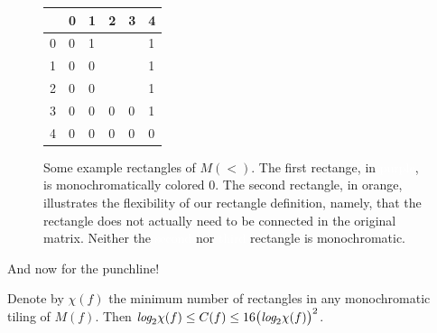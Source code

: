 \documentclass[12pt]{article}
\begin{document}
\begin{figure}[h]
\begin{minipage}{0.25\textwidth}
\begin{tabular}{|l|lllll|}
		\hline
		    & 0 & 1 & 2 & 3 & 4 \\\hline
		0   & 0 & 1 & \cellcolor{black!75}{\textcolor{white}{1}} & \cellcolor{black!75}{\textcolor{white}{1}} & 1 \\
		1   & 0 & 0 & \cellcolor{black!75}{\textcolor{white}{1}} & \cellcolor{black!75}{\textcolor{white}{1}} & 1 \\
		2   & 0 & 0 & \cellcolor{black!75}{\textcolor{white}{0}} & \cellcolor{black!75}{\textcolor{white}{1}} & 1 \\
		3   & 0 & 0 & 0 & 0 & 1 \\
		4   & 0 & 0 & 0 & 0 & 0\\\hline
		\end{tabular}   
	\end{minipage}
	\caption{Some example rectangles of $M(<)$.  The first rectange, in {\colorbox{purple!75}{\textcolor{white}{purple}}}, is monochromatically colored 0.  The second rectangle, in {\colorbox{orange!75}{orange}}, illustrates the flexibility of our rectangle definition, namely, that the rectangle does not actually need to be connected in the original matrix.  Neither the {\colorbox{purple!75}{\textcolor{white}{second}}} nor {\colorbox{black!75}{\textcolor{white}{third}}} rectangle is monochromatic.}
	\label{fig:ex:recs}
\end{figure}

And now for the punchline!

\begin{theorem}
Denote by $\chi(f)$ the minimum number of rectangles in any monochromatic tiling
of $M(f)$.  Then \(\emph{log}_2 \chi(f) \leq C(f) \leq 16 \big( \emph{log}_2 \chi(f) \big)^2\).
\end{theorem}


\end{document}
